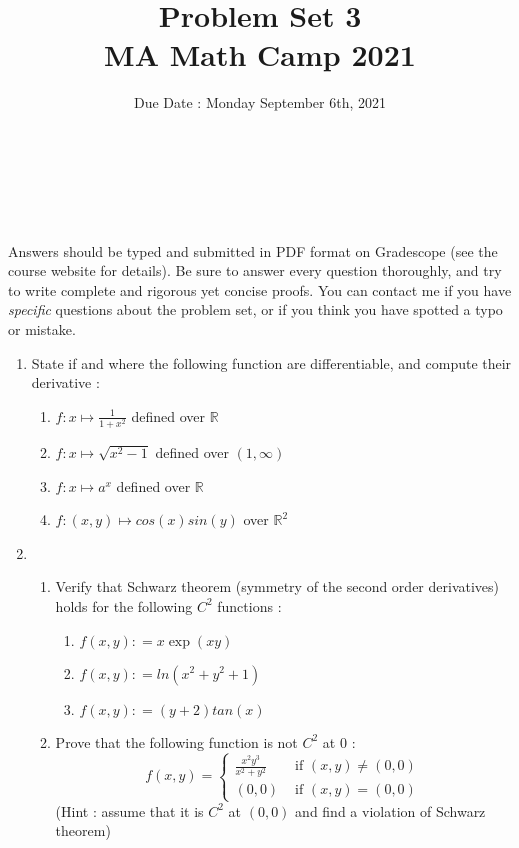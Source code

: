 \documentclass[11pt,letterpaper]{scrartcl}
\title{Problem Set 3 \\ MA Math Camp 2021 }
\author{ Due Date : Monday September 6th, 2021 }
\date{  }
\makeatletter
\newcommand{\reals}{\mathbb{R}}
\let\thetitle\@title
\let\theauthor\@author
\let\thedate\@date
\newcommand\makesimpletitle{%
\noindent 
\textbf{\large \thetitle} \\
\-\ \hspace{.2cm} { \large \theauthor } \\ 
\-\ \hspace{.2cm} { \normalsize \thedate }
}
\makeatother
\begin{document}


\makesimpletitle

Answers should be typed and submitted in PDF format on Gradescope (see the course website for details). Be sure to answer every question thoroughly, and try to write complete and rigorous yet concise proofs. You can contact me if you have \emph{specific} questions about the problem set, or if you think you have spotted a typo or mistake.

\vspace{.5cm}

\begin{enumerate}
	
	\item State if and where the following function are differentiable, and compute their derivative :
	\begin{enumerate}
		\item $f : x \mapsto \frac{1}{1+x^2}$ defined over $\reals$
		\item $f : x \mapsto \sqrt{x^2-1}$ defined over $(1,\infty)$
		\item $f : x \mapsto a^x$ defined over $\reals$
		\item $f : (x,y) \mapsto cos(x) sin(y)$ over $\reals^2$
	\end{enumerate}

	\item 
	\begin{enumerate}
		\item Verify that Schwarz theorem (symmetry of the second order derivatives) holds for the following $C^2$ functions :
		\begin{enumerate}
			\item $f(x,y) : = x \exp (xy)$ 
			\item $f(x,y) : = ln(x^2+y^2+1)$
			\item $f(x,y) : = (y+2) tan(x)$
		\end{enumerate}
		\item Prove that the following function is not $C^2$ at $0$ :
		\[
		f(x,y) = \begin{cases}
		\frac{x^2 y^3}{x^2+y^2} & \text{ if } (x,y) \neq (0,0)
		\\
		(0,0) & \text{ if } (x,y) = (0,0)
		\end{cases}
		\]
		(Hint : assume that it is $C^2$ at $(0,0)$ and find a violation of Schwarz theorem)
	\end{enumerate}
	

\end{enumerate}
\end{document}
